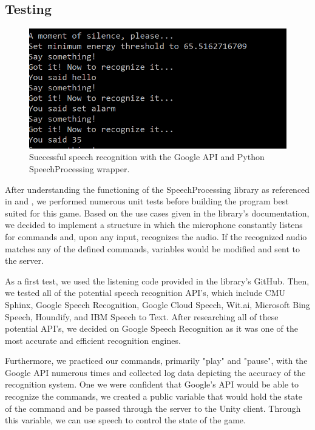 \documentclass[titlepage, 12pt]{scrartcl}
\begin{document}
    \subsection{Testing}
        \begin{figure}[ht]
            \centering
            \includegraphics[scale=1.2]{figures/speech_processing_testing.PNG}
            \caption{Successful speech recognition with the Google API and Python SpeechProcessing wrapper.}
            \label{fig:speech_testing}
        \end{figure}
        After understanding the functioning of the SpeechProcessing library as referenced in \cite{amos_2018} and \cite{uberi_2018}, we performed numerous unit tests before building the program best suited for this game. Based on the use cases given in the library's documentation, we decided to implement a structure in which the microphone constantly listens for commands and, upon any input, recognizes the audio. If the recognized audio matches any of the defined commands, variables would be modified and sent to the server. \par
        As a first test, we used the listening code provided in the library's GitHub. Then, we tested all of the potential speech recognition API's, which include CMU Sphinx, Google Speech Recognition, Google Cloud Speech, Wit.ai, Microsoft Bing Speech, Houndify, and IBM Speech to Text. After researching all of these potential API's, we decided on Google Speech Recognition as it was one of the most accurate and efficient recognition engines. \par
        Furthermore, we practiced our commands, primarily "play" and "pause", with the Google API numerous times and collected log data depicting the accuracy of the recognition system. One we were confident that Google's API would be able to recognize the commands, we created a public variable that would hold the state of the command and be passed through the server to the Unity client. Through this variable, we can use speech to control the state of the game. \par
\end{document}
